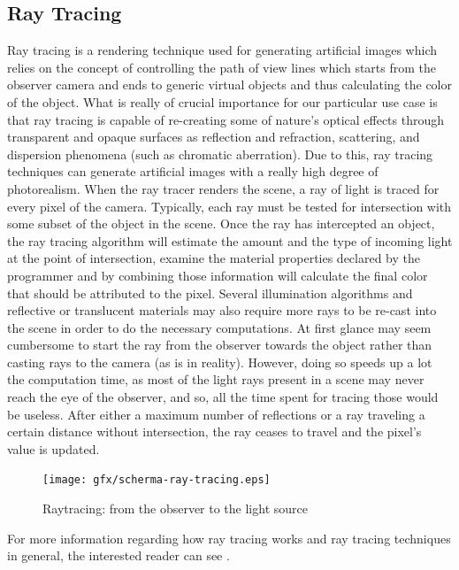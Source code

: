 \subsection{Ray Tracing}
Ray tracing is a rendering technique used for generating artificial images which relies on the concept of controlling the path of view lines which starts from the observer camera and ends to generic virtual objects and thus calculating the color of the object.
What is really of crucial importance for our particular use case is that ray tracing is capable of re-creating some of nature's optical effects through transparent and opaque surfaces as reflection and refraction, scattering, and dispersion phenomena (such as chromatic aberration).
Due to this, ray tracing techniques can generate artificial images with a really high degree of photorealism.
When the ray tracer renders the scene, a ray of light is traced for every pixel of the camera. Typically, each ray must be tested for intersection with some subset of the object in the scene. Once the ray has intercepted an object, the ray tracing algorithm will estimate the amount and the type of incoming light at the point of intersection, examine the material properties declared by the programmer and by combining those information will calculate the final color that should be attributed to the pixel.
Several illumination algorithms and reflective or translucent materials may also require more rays to be re-cast into the scene in order to do the necessary computations.
At first glance may seem cumbersome to start the ray from the observer towards the object rather than casting rays to the camera (as is in reality). However, doing so speeds up a lot the computation time, as most of the light rays present in a scene may never reach the eye of the observer, and so, all the time spent for tracing those would be useless.
After either a maximum number of reflections or a ray traveling a certain distance without intersection, the ray ceases to travel and the pixel's value is updated.

\begin{figure}[htbp]
  \centering
  \texttt{[image: gfx/scherma-ray-tracing.eps]}
  \caption{Raytracing: from the observer to the light source \cite{pictraytracing}}
  \label{fig:raytracing}
\end{figure}

For more information regarding how ray tracing works and ray tracing techniques in general, the interested reader can see \cite{introductionraytracing}.

